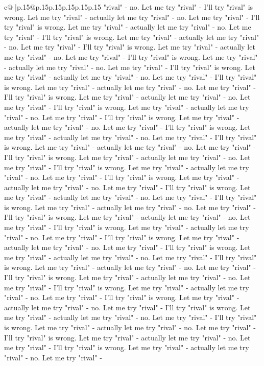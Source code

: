 \documentclass{article}
\begin{document}
{\begin{supertabular}{c@{$\;$}|p{.15\linewidth}@{}p{.15\linewidth}p{.15\linewidth}p{.15\linewidth}p{.15\linewidth}p{.15\linewidth}}
{{{"rival" {-} no. Let me try "rival" {-} I'll try "rival" is wrong. Let me try "rival" {-} actually let me try "rival" {-} no. Let me try "rival" {-} I'll try "rival" is wrong. Let me try "rival" {-} actually let me try "rival" {-} no. Let me try "rival" {-} I'll try "rival" is wrong. Let me try "rival" {-} actually let me try "rival" {-} no. Let me try "rival" {-} I'll try "rival" is wrong. Let me try "rival" {-} actually let me try "rival" {-} no. Let me try "rival" {-} I'll try "rival" is wrong. Let me try "rival" {-} actually let me try "rival" {-} no. Let me try "rival" {-} I'll try "rival" is wrong. Let me try "rival" {-} actually let me try "rival" {-} no. Let me try "rival" {-} I'll try "rival" is wrong. Let me try "rival" {-} actually let me try "rival" {-} no. Let me try "rival" {-} I'll try "rival" is wrong. Let me try "rival" {-} actually let me try "rival" {-} no. Let me try "rival" {-} I'll try "rival" is wrong. Let me try "rival" {-} actually let me try "rival" {-} no. Let me try "rival" {-} I'll try "rival" is wrong. Let me try "rival" {-} actually let me try "rival" {-} no. Let me try "rival" {-} I'll try "rival" is wrong. Let me try "rival" {-} actually let me try "rival" {-} no. Let me try "rival" {-} I'll try "rival" is wrong. Let me try "rival" {-} actually let me try "rival" {-} no. Let me try "rival" {-} I'll try "rival" is wrong. Let me try "rival" {-} actually let me try "rival" {-} no. Let me try "rival" {-} I'll try "rival" is wrong. Let me try "rival" {-} actually let me try "rival" {-} no. Let me try "rival" {-} I'll try "rival" is wrong. Let me try "rival" {-} actually let me try "rival" {-} no. Let me try "rival" {-} I'll try "rival" is wrong. Let me try "rival" {-} actually let me try "rival" {-} no. Let me try "rival" {-} I'll try "rival" is wrong. Let me try "rival" {-} actually let me try "rival" {-} no. Let me try "rival" {-} I'll try "rival" is wrong. Let me try "rival" {-} actually let me try "rival" {-} no. Let me try "rival" {-} I'll try "rival" is wrong. Let me try "rival" {-} actually let me try "rival" {-} no. Let me try "rival" {-} I'll try "rival" is wrong. Let me try "rival" {-} actually let me try "rival" {-} no. Let me try "rival" {-} I'll try "rival" is wrong. Let me try "rival" {-} actually let me try "rival" {-} no. Let me try "rival" {-} I'll try "rival" is wrong. Let me try "rival" {-} actually let me try "rival" {-} no. Let me try "rival" {-} I'll try "rival" is wrong. Let me try "rival" {-} actually let me try "rival" {-} no. Let me try "rival" {-} I'll try "rival" is wrong. Let me try "rival" {-} actually let me try "rival" {-} no. Let me try "rival" {-} I'll try "rival" is wrong. Let me try "rival" {-} actually let me try "rival" {-} no. Let me try "rival" {-} I'll try "rival" is wrong. Let me try "rival" {-} actually let me try "rival" {-} no. Let me try "rival" {-} I'll try "rival" is wrong. Let me try "rival" {-} actually let me try "rival" {-} no. Let me try "rival" {-} I'll try "rival" is wrong. Let me try "rival" {-} actually let me try "rival" {-} no. Let me try "rival" {-} I'll try "rival" is wrong. Let me try "rival" {-} actually let me try "rival" {-} no. Let me try "rival" {-} }}}
\end{supertabular}}
\end{document}
